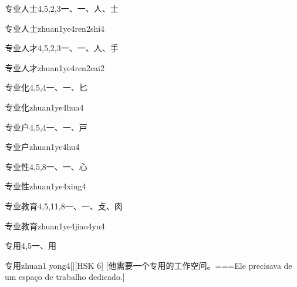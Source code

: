 \begin{Entry}{专业人士}{4,5,2,3}{⼀、⼀、⼈、⼠}
  \begin{Phonetics}{专业人士}{zhuan1ye4ren2shi4}
  \end{Phonetics}
\end{Entry}

\begin{Entry}{专业人才}{4,5,2,3}{⼀、⼀、⼈、⼿}
  \begin{Phonetics}{专业人才}{zhuan1ye4ren2cai2}
  \end{Phonetics}
\end{Entry}

\begin{Entry}{专业化}{4,5,4}{⼀、⼀、⼔}
  \begin{Phonetics}{专业化}{zhuan1ye4hua4}
  \end{Phonetics}
\end{Entry}

\begin{Entry}{专业户}{4,5,4}{⼀、⼀、⼾}
  \begin{Phonetics}{专业户}{zhuan1ye4hu4}
  \end{Phonetics}
\end{Entry}

\begin{Entry}{专业性}{4,5,8}{⼀、⼀、⼼}
  \begin{Phonetics}{专业性}{zhuan1ye4xing4}
  \end{Phonetics}
\end{Entry}

\begin{Entry}{专业教育}{4,5,11,8}{⼀、⼀、⽁、⾁}
  \begin{Phonetics}{专业教育}{zhuan1ye4jiao4yu4}
  \end{Phonetics}
\end{Entry}

\begin{Entry}{专用}{4,5}{⼀、⽤}
  \begin{Phonetics}{专用}{zhuan1 yong4}[][HSK 6]
    [他需要一个专用的工作空间。===Ele precisava de um espaço de trabalho dedicado.]
  \end{Phonetics}
\end{Entry}

